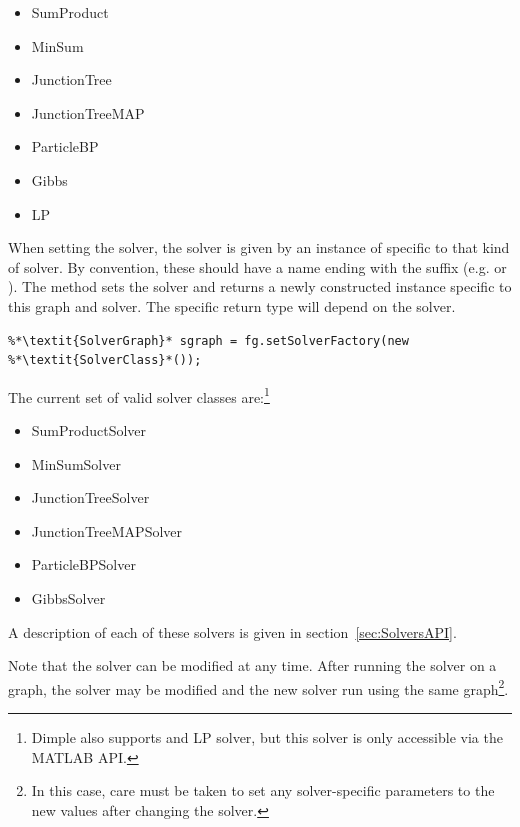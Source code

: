 \begin{itemize}
\item SumProduct
\item MinSum
\item JunctionTree
\item JunctionTreeMAP
\item ParticleBP
\item Gibbs
\item LP
\end{itemize}

\fi

\ifjava
When setting the solver, the solver is given by an instance of  specific to that kind of solver. By convention, these should have a name ending with the suffix  (e.g.  or ). The method  sets the solver and returns a newly constructed  instance specific to this graph and solver. The specific return type will depend on the solver.

\begin{lstlisting}
%*\textit{SolverGraph}* sgraph = fg.setSolverFactory(new %*\textit{SolverClass}*());
\end{lstlisting}

The current set of valid solver classes are:\footnote{Dimple also supports and LP solver, but this solver is only accessible via the MATLAB API.}

\begin{itemize}
\item SumProductSolver
\item MinSumSolver
\item JunctionTreeSolver
\item JunctionTreeMAPSolver
\item ParticleBPSolver
\item GibbsSolver
\end{itemize}

\fi


A description of each of these solvers is given in section~\ref{sec:SolversAPI}.

Note that the solver can be modified at any time.  After running the solver on a graph, the solver may be modified and the new solver run using the same graph\footnote{In this case, care must be taken to set any solver-specific parameters to the new values after changing the solver.}.


\label{sec:FactorGraph.Scheduler}

